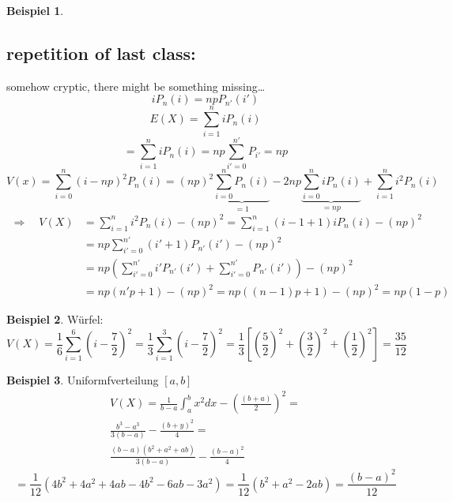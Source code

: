 \documentclass[a4paper]{article}
\theoremstyle{definition}
\newtheorem{beispiel}{Beispiel}%
\theoremstyle{remark}
\begin{document}
\begin{beispiel}
  \subsection*{repetition of last class:}
  \label{sub:repetition}
  somehow cryptic, there might be something missing\dots
 \begin{equation}
   iP_n(i)=npP_{n'}(i')
 \end{equation}
 \begin{equation}
   E(X)=\sum_{i=1}^{n}iP_n(i)
 \end{equation}
\begin{equation}
  = \sum_{i=1}^{n}iP_n(i)=np\sum_{i'=0}^{n'}	P_{i'}=np
\end{equation}
\begin{equation}
  V(x)=\sum_{i=0}^{n}(i-np)^2P_n(i)=(np)^2\underbrace{\sum_{i=0}^{n}P_n(i)}_{=1} -2np\underbrace{\sum_{i=0}^{n}iP_n(i)}_{=np} + \sum_{i=1}^{n}i^2P_n(i)
\end{equation}
\begin{equation}
  \begin{split}
  \Rightarrow \quad V(X)&=\sum_{i=1}^{n}i^2P_n(i)-(np)^2 = \sum_{i=1}^{n}(i-1+1)iP_n(i)-(np)^2\\
  &= np\sum_{i'=0}^{n'}(i'+1)P_{n'}(i') -(np)^2 \\
  &= np\left( \sum_{i'=0}^{n'}i'P_{n'}(i')+\sum_{i'=0}^{n'}P_{n'}(i') \right)-(np)^2\\
  &= np(n'p +1) -(np)^2= np\left( (n-1)p+1\right)-(np)^2=np(1-p)
  \end{split}
\end{equation}
\end{beispiel}
 \begin{beispiel}
   Würfel: 
   \begin{equation}
     V(X)= \frac{1}{6}\sum_{i=1}^{6}(i-\frac{7}{2})^2= \frac{1}{3}\sum_{i=1}^{3}(i-\frac{7}{2})^2=\frac{1}{3}\left[ (\frac{5}{2})^2 + \left( \frac{3}{2} \right)^2+\left( \frac{1}{2} \right)^2 \right]=\frac{35}{12}
   \end{equation}

 \end{beispiel} 
  \begin{beispiel}
    Uniformfverteilung $[a,b]$\\
    \begin{multline}
V(X)= \frac{1}{b-a}\int_{a}^{b}x^2dx-\left( \frac{(b+a)}{2} \right)^2 =\\
\frac{b^3-a^3}{3(b-a)}-\frac{(b+y)^2}{4}=\\
\frac{(b-a)(b^2+a^2+ab)}{3(b-a)}-\frac{(b-a)^2}{4}
    \end{multline}
  \begin{equation}
  = \frac{1}{12}(4b^2+4a^2+4ab-4b^2-6ab-3a^2)= \frac{1}{12}(b^2+a^2-2ab)=\frac{(b-a)^2}{12}
  \end{equation}
  \end{beispiel}
\end{document}
